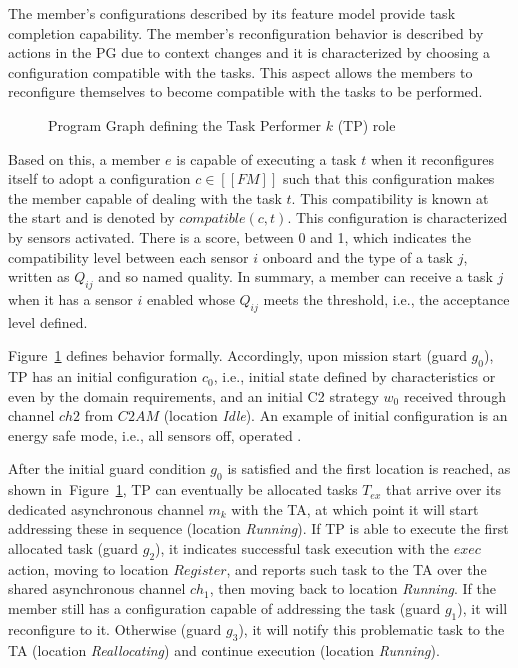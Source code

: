 The member's configurations described by its feature model provide task completion capability. The member's reconfiguration behavior is described by actions in the PG due to context changes and it is \color{black}characterized by choosing \color{black}a configuration compatible with the tasks. This aspect allows the members to reconfigure themselves to become compatible with the tasks to be performed.

\begin{figure}[ht!]
    \centering
    \scalebox{.75}{}
    \caption{Program Graph defining the Task Performer $k$ (TP) role}
    \label{fig:ex_pg}
\end{figure}

\color{black}Based on this, a member $e$ is capable of executing a task $t$ when it reconfigures itself to adopt a configuration $c \in [\![FM]\!]$ such that this configuration makes the member capable of dealing with the task $t$.  This compatibility is known at the start and is denoted by $compatible(c, t)$. \color{black}This configuration is characterized by sensors activated. There is a score, between 0 and 1, which indicates the compatibility level between each sensor $i$ onboard and the type of a task $j$, written as $Q_{ij}$ and so named quality. In summary, a member can receive a task $j$ when it has a sensor $i$ enabled whose $Q_{ij}$ meets the threshold, i.e., the acceptance level defined.  


Figure~\ref{fig:ex_pg} defines  behavior formally. Accordingly, upon mission start (guard $g_0$), TP has an initial configuration $c_0$, i.e., initial state defined by  characteristics or even by the domain requirements, and an initial C2 strategy $w_0$ received through channel $ch2$ from $C2AM$ (location \textit{Idle}). An example of initial configuration is an energy safe mode, i.e., all sensors off, operated .

After the initial guard condition $g_0$ is satisfied and the first location is reached, as shown in~Figure~\ref{fig:ex_pg}, TP can eventually be allocated tasks $T_{ex}$ that arrive over its dedicated asynchronous channel $m_k$ with the TA, at which point it will start addressing these in sequence (location \textit{Running}). If TP is able to execute the first allocated task (guard $g_2$), it indicates successful task execution with the $exec$ action, moving to location $Register$, and reports such task to the TA over the shared asynchronous channel $ch_1$, then moving back to location \textit{Running}. If the member still has a configuration capable of addressing the task (guard $g_1$), it will reconfigure to it. Otherwise (guard $g_3$), it will notify this problematic task to the TA (location \textit{Reallocating}) and continue execution (location \textit{Running}). 

